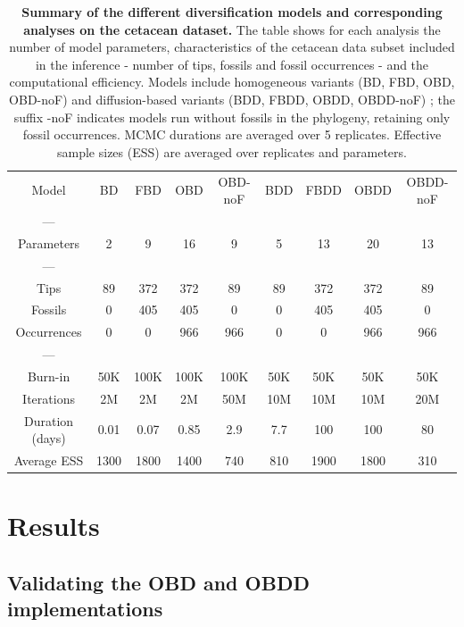 \documentclass[oupdraft]{sysbio}
\begin{document}
\begin{table}[!ht]
    \centering
    \caption{\textbf{Summary of the different diversification models and corresponding analyses on the cetacean dataset.} The table shows for each analysis the number of model parameters, characteristics of the cetacean data subset included in the inference - number of tips, fossils and fossil occurrences - and the computational efficiency. Models include homogeneous variants (BD, FBD, OBD, OBD-noF) and diffusion-based variants (BDD, FBDD, OBDD, OBDD-noF) ; the suffix -noF indicates models run without fossils in the phylogeny, retaining only fossil occurrences. MCMC durations are averaged over 5 replicates. Effective sample sizes (ESS) are averaged over replicates and parameters.}
    \begin{tabular}{ccccccccc}
         Model & BD & FBD & OBD & OBD-noF & BDD& FBDD& OBDD& OBDD-noF\\
         ---\\
         Parameters & 2 & 9 & 16 & 9 & 5 & 13 & 20 & 13\\
         ---\\
         Tips & 89 & 372 & 372 & 89 & 89 & 372 & 372 & 89\\
         Fossils & 0 & 405 & 405 & 0 & 0 & 405 & 405 & 0\\
         Occurrences & 0 & 0 & 966 & 966 & 0 & 0 & 966 & 966\\
         ---\\
         Burn-in & 50K & 100K & 100K & 100K & 50K & 50K & 50K& 50K\\
         Iterations & 2M & 2M & 2M & 50M & 10M & 10M & 10M & 20M\\
         Duration (days) & 0.01 & 0.07 & 0.85 & 2.9 & 7.7 & 100 & 100 & 80 \\
         Average ESS & 1300 & 1800 & 1400 & 740 & 810 & 1900 & 1800 & 310 \\
    \end{tabular}
    \label{tab:models}
\end{table}

\FloatBarrier
\section{Results}
\subsection{Validating the OBD and OBDD implementations}
\end{document}
